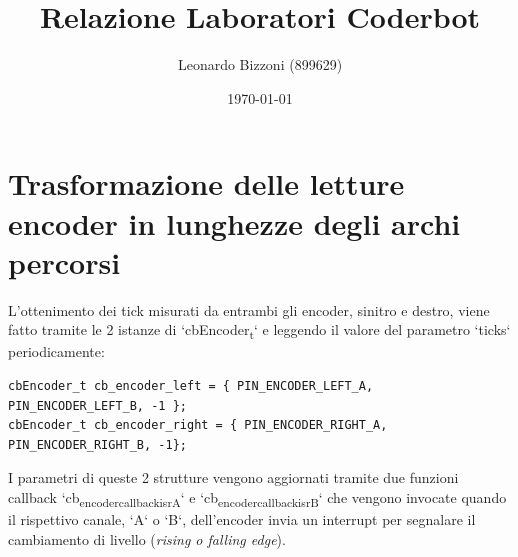 \documentclass[11pt]{article}
\author{Leonardo Bizzoni (899629)}
\date{\today}
\title{Relazione Laboratori Coderbot}
\begin{document}
\maketitle
\tableofcontents

\section{Trasformazione delle letture encoder in lunghezze degli archi percorsi}
\label{sec:orgb5719a4}
L'ottenimento dei tick misurati da entrambi gli encoder, sinitro e destro, viene fatto tramite le 2 istanze di `cbEncoder\textsubscript{t}` e leggendo il valore del parametro `ticks` periodicamente:
\begin{verbatim}
cbEncoder_t cb_encoder_left = { PIN_ENCODER_LEFT_A, PIN_ENCODER_LEFT_B, -1 };
cbEncoder_t cb_encoder_right = { PIN_ENCODER_RIGHT_A, PIN_ENCODER_RIGHT_B, -1};
\end{verbatim}

I parametri di queste 2 strutture vengono aggiornati tramite due funzioni callback `cb\textsubscript{encoder}\textsubscript{callback}\textsubscript{isrA}` e `cb\textsubscript{encoder}\textsubscript{callback}\textsubscript{isrB}` che vengono invocate quando il rispettivo canale, `A` o `B`, dell'encoder invia un interrupt per segnalare il cambiamento di livello (\emph{rising o falling edge}).
\end{document}
